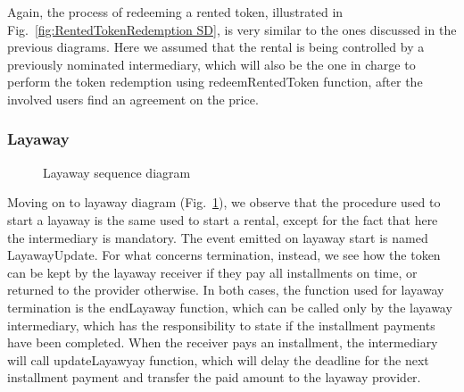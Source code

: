 \documentclass[english, LaM, oneside]{sapthesis}%
\begin{document}
Again, the process of redeeming a rented token, illustrated in Fig.~\ref{fig:RentedTokenRedemption SD}, is very similar to the ones discussed in the previous diagrams. Here we assumed that the rental is being controlled by a previously nominated intermediary, which will also be the one in charge to perform the token redemption using redeemRentedToken function, after the involved users find an agreement on the price.\newline
\bigskip

\subsubsection{Layaway}

\begin{figure}[H]
    \centering
        \begin{adjustbox}{width=1\textwidth}
        \end{adjustbox}
    \caption{Layaway sequence diagram}
    \label{fig:Layaway SD}
\end{figure}

Moving on to layaway diagram (Fig.~\ref{fig:Layaway SD}), we observe that the procedure used to start a layaway is the same used to start a rental, except for the fact that here the intermediary is mandatory. The event emitted on layaway start is named LayawayUpdate. For what concerns termination, instead, we see how the token can be kept by the layaway receiver if they pay all installments on time, or returned to the provider otherwise. In both cases, the function used for layaway termination is the endLayaway function, which can be called only by the layaway intermediary, which has the responsibility to state if the installment payments have been completed.\newline
When the receiver pays an installment, the intermediary will call updateLayawyay function, which will delay the deadline for the next installment payment and transfer the paid amount to the layaway provider.
\end{document}
